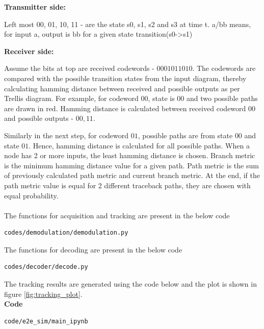 \textbf{Transmitter side:} 

\noindent Left most 00, 01, 10, 11 - are the state s0, s1, s2 and s3 at time t. a/bb means, for input a, output is bb for a given state transition(s0->s1)


\textbf{Receiver side:} 

\noindent Assume the bits at top are received codewords - $00 01 01 10 10$. The codewords are compared with the possible transition states from the input diagram, thereby calculating hamming distance between received and possible outputs as per Trellis diagram. For example, for codeword $00$, state is $00$ and two possible paths are drawn in red. Hamming distance is calculated between received codeword $00$ and possible outputs - $00, 11$.

\noindent Similarly in the next step, for codeword $01$, possible paths are from state $00$ and state $01$. Hence, hamming distance is calculated for all possible paths. When a node has 2 or more inputs, the least hamming distance is chosen. Branch metric is the minimum hamming distance value for a given path. Path metric is the sum of previously calculated path metric and current branch metric. At the end, if the path metric value is equal for 2 different traceback paths, they are chosen with equal probability.
\\
\\
The functions for acquisition and tracking are present in the below code
\begin{lstlisting}
codes/demodulation/demodulation.py
\end{lstlisting}
The functions for decoding are present in the below code
\begin{center}
 \begin{lstlisting}
codes/decoder/decode.py
 \end{lstlisting}
\end{center}
The tracking results are generated using the code below and the plot is shown in figure \ref{fig:tracking_plot}.\\
\textbf{Code}
\begin{lstlisting}
code/e2e_sim/main_ipynb
\end{lstlisting}






